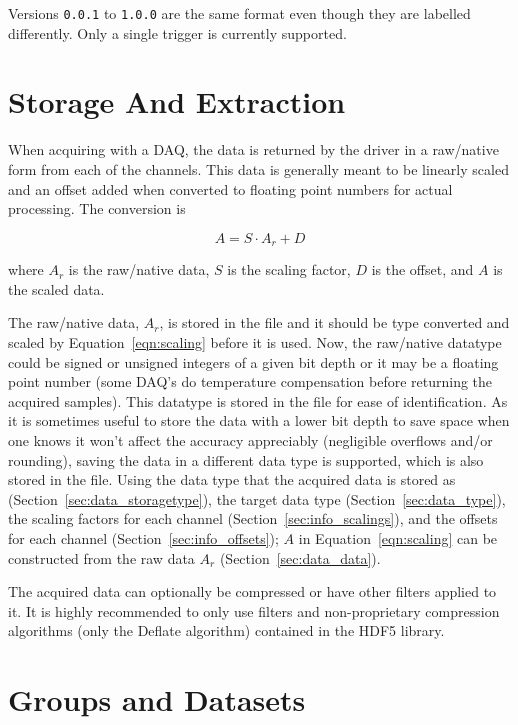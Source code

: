 \documentclass[12pt]{article} %
\begin{document}
Versions \verb|0.0.1| to \verb|1.0.0| are the same format even though they are labelled differently.
Only a single trigger is currently supported.

\section{Storage And Extraction}

When acquiring with a DAQ, the data is returned by the driver in a raw/native form from each of the channels.
This data is generally meant to be linearly scaled and an offset added when converted to floating point numbers for actual processing.
The conversion is

\begin{equation}
	\label{eqn:scaling}
	A = S \cdot A_r + D
\end{equation}

\noindent where $A_r$ is the raw/native data, $S$ is the scaling factor, $D$ is the offset, and $A$ is the scaled data.

The raw/native data, $A_r$, is stored in the file and it should be type converted and scaled by Equation~\ref{eqn:scaling} before it is used.
Now, the raw/native datatype could be signed or unsigned integers of a given bit depth or it may be a floating point number (some DAQ's do temperature compensation before returning the acquired samples).
This datatype is stored in the file for ease of identification.
As it is sometimes useful to store the data with a lower bit depth to save space when one knows it won't affect the accuracy appreciably (negligible overflows and/or rounding), saving the data in a different data type is supported, which is also stored in the file.
Using the data type that the acquired data is stored as (Section~\ref{sec:data_storagetype}), the target data type (Section~\ref{sec:data_type}), the scaling factors for each channel (Section~\ref{sec:info_scalings}), and the offsets for each channel (Section~\ref{sec:info_offsets}); $A$ in Equation~\ref{eqn:scaling} can be constructed from the raw data $A_r$ (Section~\ref{sec:data_data}).

The acquired data can optionally be compressed or have other filters applied to it.
It is highly recommended to only use filters and non-proprietary compression algorithms (only the Deflate algorithm) contained in the HDF5 library.



\section{Groups and Datasets}
\end{document}
